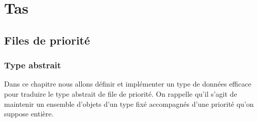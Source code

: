 \chapter{Tas} 
\vskip -2cm
\section{Files de priorité}
\subsection{Type abstrait}
Dans ce chapitre nous allons définir et implémenter un type de données efficace pour traduire le type abstrait de  file de priorité.
On rappelle qu'il s'agit de maintenir un ensemble d'objets d'un type fixé accompagnés d'une priorité qu'on suppose entière.


